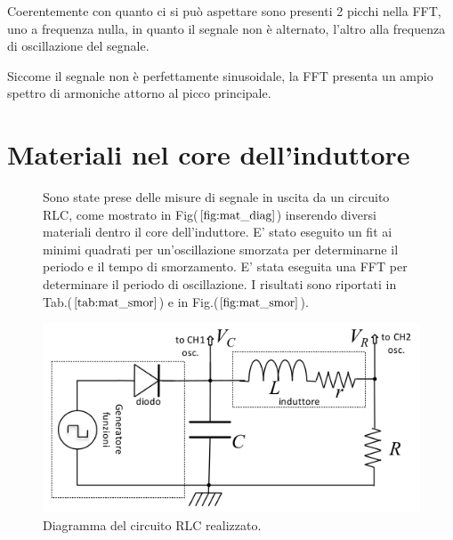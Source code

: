 \documentclass{article}
\begin{document}
    Coerentemente con quanto ci si può aspettare sono presenti 2 picchi nella FFT,
    uno a frequenza nulla, in quanto il segnale non è alternato, l'altro
    alla frequenza di oscillazione del segnale.

    Siccome il segnale non è perfettamente sinusoidale, la FFT
    presenta un ampio spettro di armoniche attorno al picco principale.

\section{Materiali nel core dell'induttore}
\begin{figure}[H]
    \begin{minipage}{0.45\textwidth}
        Sono state prese delle misure di segnale in uscita da un circuito RLC,
        come mostrato in Fig($\ref{fig:mat_diag}$) inserendo diversi materiali dentro 
        il core dell'induttore.
        E' stato eseguito un fit ai minimi quadrati per un'oscillazione 
        smorzata per determinarne il periodo e il tempo di smorzamento.
        E' stata eseguita una FFT per determinare il periodo di oscillazione.
        I risultati sono riportati in Tab.($\ref{tab:mat_smor}$) e 
        in Fig.($\ref{fig:mat_smor}$).
    \end{minipage}
    \hfill
    \begin{minipage}{0.45\textwidth}
        \includegraphics[width=\textwidth]{FFT13/RLCmaterialsdiagram.png}
        \caption{Diagramma del circuito RLC realizzato.}
        \label{fig:mat_diag}
    \end{minipage}
\end{figure}
\end{document}
